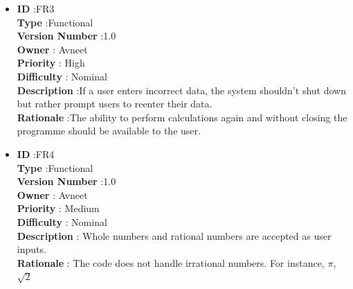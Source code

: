 \documentclass[a4paper,12pt]{report}
\begin{document}
\begin{itemize}
	\item
    \textbf{ID } \hspace{3cm} :FR3  \\
	\textbf{Type } \hspace{2.4cm}  :Functional\\
	\textbf{Version Number} \hspace{0.3cm} :1.0  \\
	\textbf{Owner } \hspace{1.98cm} : Avneet \\
	\textbf{Priority } \hspace{1.75cm} : High\\
	\textbf{Difficulty } \hspace{1.5cm} : Nominal\\
	\textbf{Description }\hspace{1.2cm} :If a user enters incorrect data, the system shouldn't shut down but rather prompt users to reenter their data.\\
	\textbf{Rationale }\hspace{1.6cm} :The ability to perform calculations again and without closing the programme should be available to the user. \\

	\item
    \textbf{ID } \hspace{3cm} :FR4  \\
	\textbf{Type } \hspace{2.4cm}  :Functional\\
	\textbf{Version Number} \hspace{0.3cm} :1.0  \\
	\textbf{Owner } \hspace{1.98cm} : Avneet \\
	\textbf{Priority } \hspace{1.75cm} : Medium\\
	\textbf{Difficulty } \hspace{1.5cm} : Nominal\\
	\textbf{Description }\hspace{1.2cm} : Whole numbers and rational numbers are accepted as user inputs.\\
	\textbf{Rationale }\hspace{1.6cm} : The code does not handle irrational numbers. For instance, $\pi$, $\sqrt{2}$ \\


\end{itemize}
\end{document}
